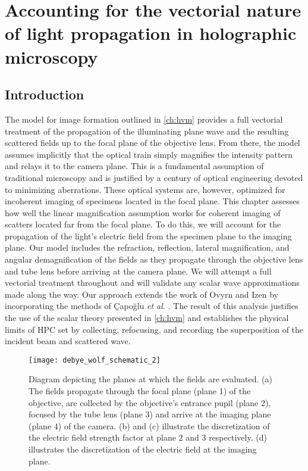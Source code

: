 \chapter{Accounting for the vectorial nature of light propagation in holographic microscopy}
\label{ch:debye}




\section{Introduction}

The model for image formation outlined in \autoref{ch:hvm} provides a full
vectorial treatment of the propagation of the illuminating plane wave and
the resulting scattered fields up to the focal plane of the objective lens.
From there, the model assumes implicitly that the optical train
simply magnifies the intensity pattern and relays it to the camera plane.
This is a fundamental assumption of traditional microscopy and is justified
by a century of optical engineering devoted to minimizing aberrations.
These optical systems are, however, optimized for incoherent imaging of
specimens located in the focal plane.
This chapter assesses how well the linear magnification assumption works for
coherent imaging of scatters located far from the focal plane. To do this, we will
account for the propagation of the light's electric field from
the specimen plane to the imaging plane. Our model includes the
refraction, reflection, lateral magnification, and angular demagnification
of the fields as they propagate through the objective lens and tube lens
before arriving at the camera plane. We will attempt a full vectorial
treatment throughout and will validate any scalar wave approximations
made along the way. Our approach extends the work of
Ovyrn and Izen\cite{izen00} by incorporating the methods of \c{C}apo\u{g}lu \emph{et al.}
\cite{capoglu12}. 
The result of this analysis justifies the use of the scalar theory presented in \autoref{ch:hvm} and
establishes the physical limits of HPC set by collecting, refocusing, and recording
the superposition of the incident beam and scattered wave.

\begin{figure}
  \centering
  \texttt{[image: debye\_wolf\_schematic\_2]}
  \caption{Diagram depicting the planes at which the fields are evaluated.
    (a) The fields propagate through the focal plane (plane 1) of the objective,
    are collected by the objective's entrance pupil (plane 2), focused by the tube lens (plane 3)
    and arrive at the imaging plane (plane 4) of the camera. (b) and (c) illustrate the
    discretization of the electric field strength factor at plane 2 and 3 respectively.
    (d) illustrates the discretization of the electric field at the imaging plane.}
  \label{fig:debye_schematic}
\end{figure}

